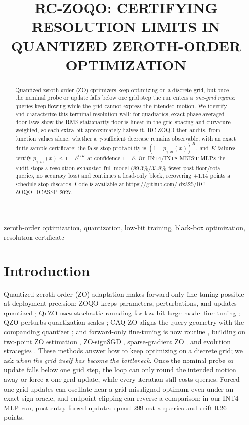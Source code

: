 \documentclass{article}
\title{RC-ZOQO: CERTIFYING RESOLUTION LIMITS IN QUANTIZED ZEROTH-ORDER OPTIMIZATION}
\begin{document}
\ninept
\maketitle
\vspace{-0.75em}

\begin{abstract}
Quantized zeroth-order (ZO) optimizers keep optimizing on a discrete grid, but once the nominal probe
or update falls below one grid step the run enters a \emph{one-grid regime}: queries keep flowing while
the grid cannot express the intended motion. We identify
and characterize this terminal resolution wall: for quadratics, exact phase-averaged floor laws show
the RMS stationarity floor is linear in the grid spacing and curvature-weighted, so each extra bit
approximately halves it. RC-ZOQO then audits, from function values alone, whether a $\gamma$-sufficient
decrease remains observable, with an exact finite-sample certificate: the false-stop probability is
$(1-p_{\gamma,m}(x))^K$, and $K$ failures certify $p_{\gamma,m}(x)\le1-\delta^{1/K}$ at confidence
$1-\delta$. On INT4/INT8 MNIST MLPs the audit stops a resolution-exhausted full model
($89.3$\%/$33.8$\% fewer post-floor/total queries, no accuracy loss) and continues a head-only block,
recovering $+1.14$ points a schedule stop discards.
Code is available at \url{https://github.com/ldx825/RC-ZOQO_ICASSP-2027}.
\end{abstract}

\begin{keywords}
zeroth-order optimization, quantization, low-bit training, black-box optimization, resolution certificate
\end{keywords}

\section{Introduction}
Quantized zeroth-order (ZO) adaptation makes forward-only fine-tuning possible at deployment precision: ZOQO keeps parameters, perturbations, and updates quantized \cite{bar2025zoqo}; QuZO uses stochastic rounding for low-bit large-model fine-tuning \cite{zhou2025quzo}; QZO perturbs quantization scales \cite{shang2026qzo}; CAQ-ZO aligns the query geometry with the companding quantizer \cite{shu2026caq}; and forward-only fine-tuning is now routine \cite{malladi2023mezo}, building on two-point ZO estimation \cite{kiefer1952,spall1992spsa,nesterov2017random,duchi2015optimal,liu2020primer}, ZO-signSGD \cite{liu2019zosign}, sparse-gradient ZO \cite{cai2022zoro}, and evolution strategies \cite{salimans2017es}. These methods answer how to keep optimizing on a discrete grid; we ask \emph{when the grid itself has become the bottleneck}. Once the nominal probe or update falls below one grid step, the loop can only round the intended motion away or force a one-grid update, while every iteration still costs queries. Forced one-grid updates can oscillate near a grid-misaligned optimum even under an exact sign oracle, and endpoint clipping can reverse a comparison; in our INT4 MLP run, post-entry forced updates spend $299$ extra queries and drift $0.26$ points.
\end{document}
